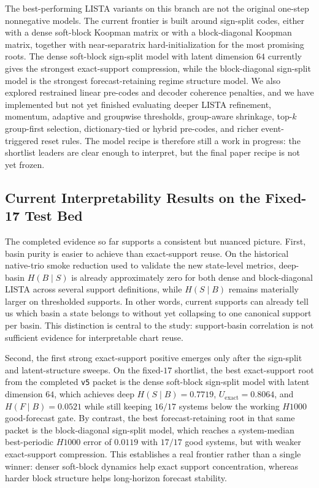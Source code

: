 The best-performing LISTA variants on this branch are not the original
one-step nonnegative models. The current frontier is built around sign-split
codes, either with a dense soft-block Koopman matrix or with a block-diagonal
Koopman matrix, together with near-separatrix hard-initialization for the most
promising roots. The dense soft-block sign-split model with latent dimension
$64$ currently gives the strongest exact-support compression, while the
block-diagonal sign-split model is the strongest forecast-retaining regime
structure model. We also explored restrained linear pre-codes and decoder
coherence penalties, and we have implemented but not yet finished evaluating
deeper LISTA refinement, momentum, adaptive and groupwise thresholds,
group-aware shrinkage, top-$k$ group-first selection, dictionary-tied or
hybrid pre-codes, and richer event-triggered reset rules. The model recipe is
therefore still a work in progress: the shortlist leaders are clear enough to
interpret, but the final paper recipe is not yet frozen.

\subsection{Current Interpretability Results on the Fixed-17 Test Bed}
\label{sec:fixed17-interpretability-results}

The completed evidence so far supports a consistent but nuanced picture.
First, basin purity is easier to achieve than exact-support reuse. On the
historical native-trio smoke reduction used to validate the new state-level
metrics, deep-basin $H(B \mid S)$ is already approximately zero for both dense
and block-diagonal LISTA across several support definitions, while
$H(S \mid B)$ remains materially larger on thresholded supports. In other
words, current supports can already tell us which basin a state belongs to
without yet collapsing to one canonical support per basin. This distinction is
central to the study: support-basin correlation is not sufficient evidence for
interpretable chart reuse.

Second, the first strong exact-support positive emerges only after the
sign-split and latent-structure sweeps. On the fixed-$17$ shortlist, the best
exact-support root from the completed \texttt{v5} packet is the dense
soft-block sign-split model with latent dimension $64$, which achieves deep
$H(S \mid B)=0.7719$, $U_{\mathrm{exact}}=0.8064$, and
$H(F \mid B)=0.0521$ while still keeping $16/17$ systems below the working
$H1000$ good-forecast gate. By contrast, the best forecast-retaining root in
that same packet is the block-diagonal sign-split model, which reaches a
system-median best-periodic $H1000$ error of $0.0119$ with $17/17$ good
systems, but with weaker exact-support compression. This establishes a real
frontier rather than a single winner: denser soft-block dynamics help exact
support concentration, whereas harder block structure helps long-horizon
forecast stability.

